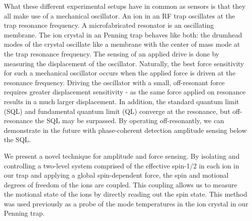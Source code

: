 \documentclass[aps,prl,twocolumn,groupedaddress]{revtex4-1}
\begin{document}
What these different experimental setups have in common as sensors is that they all make use of a mechanical oscillator. An ion in an RF trap oscillates at the trap resonance frequency. A microfabricated resonator is an oscillating membrane. The ion crystal in an Penning trap behaves like both: the drumhead modes of the crystal oscillate like a membrane with the center of mass mode at the trap resonance frequency. The sensing of an applied drive is done by measuring the displacement of the oscillator. Naturally, the best force sensitivity for such a mechanical oscillator occurs when the applied force is driven at the resonance frequency. Driving the oscillator with a small, off-resonant force requires greater displacement sensitivity - as the same force applied on resonance results in a much larger displacement. In addition, the standard quantum limit (SQL) and fundamental quantum limit (QL) converge at the resonance, but off-resonance the SQL may be surpassed. By operating off-resonantly, we can demonstrate in the future with phase-coherent detection amplitude sensing below the SQL.

We present a novel technique for amplitude and force sensing. By isolating and controlling a two-level system comprised of the effective spin-1/2 in each ion in our trap and applying a global spin-dependent force, the spin and motional degrees of freedom of the ions are coupled. This coupling allows us to measure the motional state of the ions by directly reading out the spin state. This method was used previously as a probe of the mode temperatures in the ion crystal in our Penning trap.
\end{document}
